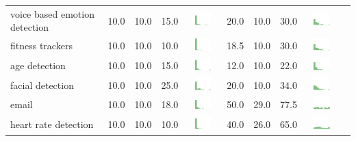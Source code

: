 \begin{table}[t]
\begin{center}
\begin{tabular}{| p{2cm} | p{1cm} | p{1cm} | p{1cm} | c | p{2cm} | p{1cm} | p{1cm} | p{1cm} | c |}
voice based emotion detection & 10.0 & 10.0 & 15.0 & \includegraphics[width = 2cm, height = 0.5cm]{tables/voicebasedemotiondetectionrisk} & 20.0 & 10.0 & 30.0 & \includegraphics[width = 2cm, height = 0.5cm]{tables/voicebasedemotiondetectionben} \\ 
fitness trackers & 10.0 & 10.0 & 10.0 & \includegraphics[width = 2cm, height = 0.5cm]{tables/fitnesstrackersrisk} & 18.5 & 10.0 & 30.0 & \includegraphics[width = 2cm, height = 0.5cm]{tables/fitnesstrackersben} \\ 
age detection & 10.0 & 10.0 & 15.0 & \includegraphics[width = 2cm, height = 0.5cm]{tables/agedetectionrisk} & 12.0 & 10.0 & 22.0 & \includegraphics[width = 2cm, height = 0.5cm]{tables/agedetectionben} \\ 
facial detection & 10.0 & 10.0 & 25.0 & \includegraphics[width = 2cm, height = 0.5cm]{tables/facialdetectionrisk} & 20.0 & 10.0 & 34.0 & \includegraphics[width = 2cm, height = 0.5cm]{tables/facialdetectionben} \\ 
email & 10.0 & 10.0 & 18.0 & \includegraphics[width = 2cm, height = 0.5cm]{tables/emailrisk} & 50.0 & 29.0 & 77.5 & \includegraphics[width = 2cm, height = 0.5cm]{tables/emailben} \\ 
heart rate detection & 10.0 & 10.0 & 10.0 & \includegraphics[width = 2cm, height = 0.5cm]{tables/heartratedetectionrisk} & 40.0 & 26.0 & 65.0 & \includegraphics[width = 2cm, height = 0.5cm]{tables/heartratedetectionben} \\ 

\end{tabular}
\end{center}
\end{table}
